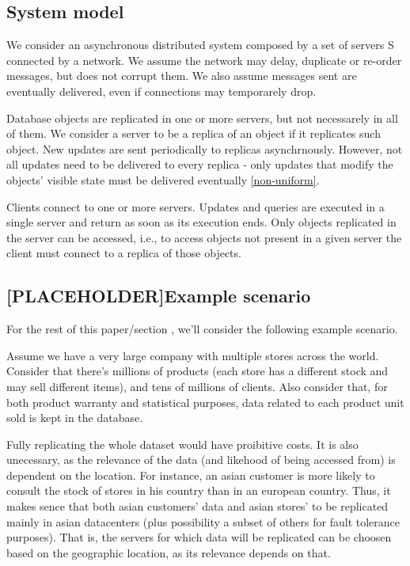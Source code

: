 \documentclass{vldb}
\begin{document}
\subsection{System model}

We consider an asynchronous distributed system composed by a set of servers S connected by a network. We assume the network may delay, duplicate or re-order messages, but does not corrupt them. We also assume messages sent are eventually delivered, even if connections may temporarely drop.

Database objects are replicated in one or more servers, but not necessarely in all of them.  We consider a server to be a replica of an object if it replicates such object. New updates are sent periodically to replicas asynchrnously. However, not all updates need to be delivered to every replica - only updates that modify the objects' visible state must be delivered eventually \ref{non-uniform}. %


Clients connect to one or more servers. Updates and queries are executed in a single server and return as soon as its execution ends. Only objects replicated in the server can be accessed, i.e., to access objects not present in a given server the client must connect to a replica of those objects.

\subsection{[PLACEHOLDER]Example scenario}
\label{subsec:example}

For the rest of this paper/section %
, we'll consider the following example scenario.

Assume we have a very large company with multiple stores across the world.
Consider that there's millions of products (each store has a different stock and may sell different items), and tens of millions of clients.
Also consider that, for both product warranty and statistical purposes, data related to each product unit sold is kept in the database.

Fully replicating the whole dataset would have proibitive costs.
It is also unecessary, as the relevance of the data (and likehood of being accessed from) is dependent on the location.
For instance, an asian customer is more likely to consult the stock of stores in his country than in an european country.
Thus, it makes sence that both asian customers' data and asian stores' to be replicated mainly in asian datacenters (plus possibility a subset of others for fault tolerance purposes).
That is, the servers for which data will be replicated can be choosen based on the geographic location, as its relevance depends on that.
\end{document}
